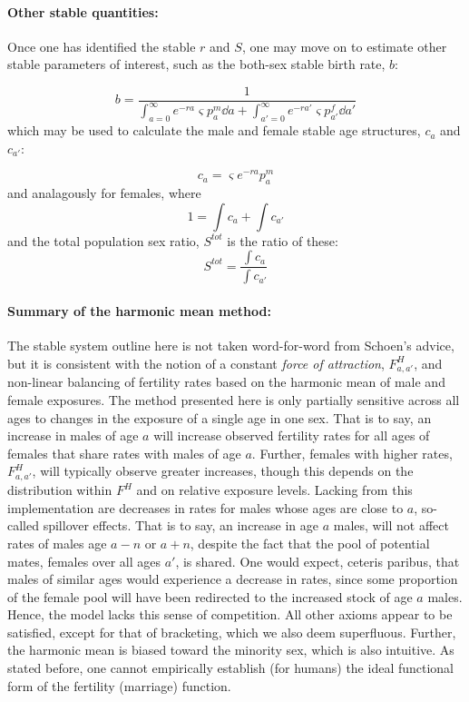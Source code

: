 \paragraph{Other stable quantities: } Once one has identified the stable $r$ and
$S$, one may move on to estimate other stable parameters of interest, such as the 
both-sex stable birth rate, $b$:

\begin{equation}
b = \frac{1}{\int_{a = 0}^\infty e^{-ra} \varsigma p_a^m \dd a + \int_{a' =
0}^\infty e^{-ra'} \varsigma p_{a'}^f \dd a'}
\end{equation}
which may be used to calculate the male and female stable age structures, $c_a$
and $c_{a'}$:

\begin{equation}
c_a =  \varsigma  e^{-ra} p_a^m
\end{equation}
and analagously for females, where
\begin{equation}
1 = \int c_a + \int c_{a'}
\end{equation}
and the total population sex ratio, $S^{tot}$ is the ratio of these:
\begin{equation}
S^{tot} = \frac{\int c_a}{\int c_{a'}}
\end{equation}

\paragraph{Summary of the harmonic mean method: } The stable system outline here
is not taken word-for-word from Schoen's advice, but it is consistent with the 
notion of a constant \textit{force of attraction},
$F_{a,a'}^H$, and non-linear balancing of fertility rates based on the harmonic
mean of male and female exposures. The method presented here is only partially
sensitive across all ages to changes in the exposure of a single age in one sex.
That is to say, an increase in males of age $a$ will increase observed fertility rates for all ages
of females that share rates with males of age $a$. Further, females with
higher rates, $F_{a,a'}^H$, will typically observe greater increases, though this
depends on the distribution within $F^H$ and on relative exposure levels.
Lacking from this implementation are decreases in rates for males whose ages are close
to $a$, so-called spillover effects\citep{choo2006estimating}. That is to say,
an increase in age $a$ males, will not affect rates of males age $a-n$ or $a+n$, 
despite the fact that the pool of potential mates, females over
all ages $a'$, is shared. One would expect, ceteris paribus, that males of
similar ages would experience a decrease in rates, since some proportion of the
female pool will have been redirected to the increased stock of age $a$ males.
Hence, the model lacks this sense of competition. All other axioms appear to be
satisfied, except for that of bracketing, which we also deem superfluous.
Further, the harmonic mean is biased toward the minority sex, which is also intuitive.
 As stated before, one cannot empirically establish (for
humans) the ideal functional form of the fertility (marriage) function.

